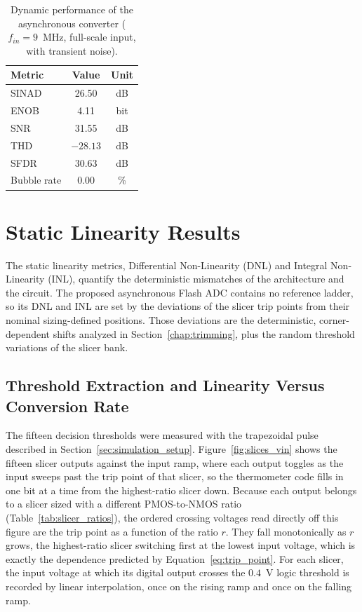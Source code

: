 \begin{table}[htbp]
    \centering
    \caption{Dynamic performance of the asynchronous converter ($f_{in} = 9$~MHz, full-scale input, with transient noise).}
    \label{tab:dynamic_results}
    \renewcommand{\arraystretch}{1.3}
    \begin{tabular}{lcc}
        \toprule
        \textbf{Metric} & \textbf{Value} & \textbf{Unit} \\
        \midrule
        SINAD        & 26.50  & dB    \\
        ENOB         & 4.11   & bit   \\
        SNR          & 31.55  & dB    \\
        THD          & $-28.13$ & dB  \\
        SFDR         & 30.63  & dB    \\
        Bubble rate  & 0.00   & \%    \\
        \bottomrule
    \end{tabular}
\end{table}

 

\section{Static Linearity Results}
\label{sec:static_linearity}

The static linearity metrics, Differential Non-Linearity (DNL) and Integral Non-Linearity (INL), quantify the deterministic mismatches of the architecture and the circuit. The proposed asynchronous Flash ADC contains no reference ladder, so its DNL and INL are set by the deviations of the slicer trip points from their nominal sizing-defined positions. Those deviations are the deterministic, corner-dependent shifts analyzed in Section~\ref{chap:trimming}, plus the random threshold variations of the slicer bank.

\subsection{Threshold Extraction and Linearity Versus Conversion Rate}
\label{subsec:static_ramp}

The fifteen decision thresholds were measured with the trapezoidal pulse described in Section~\ref{sec:simulation_setup}. Figure~\ref{fig:slices_vin} shows the fifteen slicer outputs against the input ramp, where each output toggles as the input sweeps past the trip point of that slicer, so the thermometer code fills in one bit at a time from the highest-ratio slicer down. Because each output belongs to a slicer sized with a different PMOS-to-NMOS ratio (Table~\ref{tab:slicer_ratios}), the ordered crossing voltages read directly off this figure are the trip point as a function of the ratio $r$. They fall monotonically as $r$ grows, the highest-ratio slicer switching first at the lowest input voltage, which is exactly the dependence predicted by Equation~\eqref{eq:trip_point}. For each slicer, the input voltage at which its digital output crosses the $0.4$~V logic threshold is recorded by linear interpolation, once on the rising ramp and once on the falling ramp.

